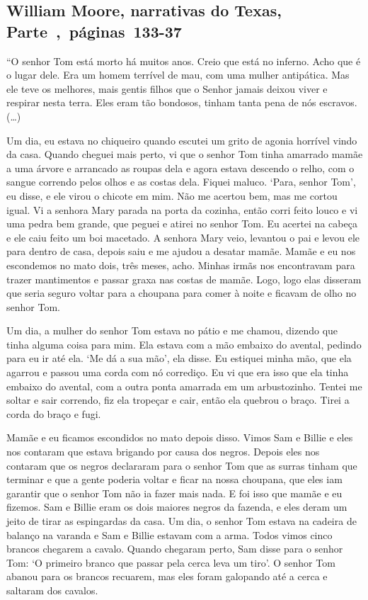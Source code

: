 \subsection{William Moore, narrativas do Texas, Parte~,~páginas~133-37}
\label{ref198}

``O senhor Tom está morto há muitos anos. Creio que está no inferno.
Acho que é o lugar dele. Era um homem terrível de mau, com uma mulher
antipática. Mas ele teve os melhores, mais gentis filhos que o Senhor
jamais deixou viver e respirar nesta terra. Eles eram tão bondosos,
tinham tanta pena de nós escravos. (\ldots{})

Um dia, eu estava no chiqueiro quando escutei um grito de agonia
horrível vindo da casa. Quando cheguei mais perto, vi que o senhor Tom
tinha amarrado mamãe a uma árvore e arrancado as roupas dela e agora
estava descendo o relho, com o sangue correndo pelos olhos e as costas
dela. Fiquei maluco. `Para, senhor Tom', eu disse, e ele virou o chicote
em mim. Não me acertou bem, mas me cortou igual. Vi a senhora Mary
parada na porta da cozinha, então corri feito louco e vi uma pedra bem
grande, que peguei e atirei no senhor Tom. Eu acertei na cabeça e ele
caiu feito um boi macetado. A senhora Mary veio, levantou o pai e levou
ele para dentro de casa, depois saiu e me ajudou a desatar mamãe. Mamãe
e eu nos escondemos no mato dois, três meses, acho. Minhas irmãs nos
encontravam para trazer mantimentos e passar graxa nas costas de mamãe.
Logo, logo elas disseram que seria seguro voltar para a choupana para
comer à noite e ficavam de olho no senhor Tom.

Um dia, a mulher do senhor Tom estava no pátio e me chamou, dizendo que
tinha alguma coisa para mim. Ela estava com a mão embaixo do avental,
pedindo para eu ir até ela. `Me dá a sua mão', ela disse. Eu estiquei
minha mão, que ela agarrou e passou uma corda com nó corrediço. Eu vi
que era isso que ela tinha embaixo do avental, com a outra ponta
amarrada em um arbustozinho. Tentei me soltar e sair correndo, fiz ela
tropeçar e cair, então ela quebrou o braço. Tirei a corda do braço e
fugi.

Mamãe e eu ficamos escondidos no mato depois disso. Vimos Sam e Billie e
eles nos contaram que estava brigando por causa dos negros. Depois eles
nos contaram que os negros declararam para o senhor Tom que as surras
tinham que terminar e que a gente poderia voltar e ficar na nossa
choupana, que eles iam garantir que o senhor Tom não ia fazer mais nada.
E foi isso que mamãe e eu fizemos. Sam e Billie eram os dois maiores
negros da fazenda, e eles deram um jeito de tirar as espingardas da
casa. Um dia, o senhor Tom estava na cadeira de balanço na varanda e Sam
e Billie estavam com a arma. Todos vimos cinco brancos chegarem a
cavalo. Quando chegaram perto, Sam disse para o senhor Tom: `O primeiro
branco que passar pela cerca leva um tiro'. O senhor Tom abanou para os
brancos recuarem, mas eles foram galopando até a cerca e saltaram dos
cavalos.

